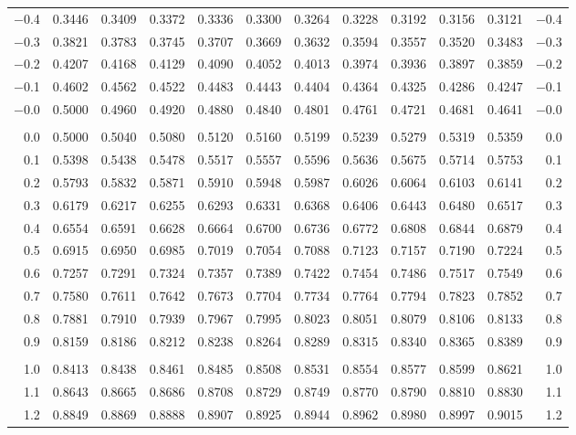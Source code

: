 \documentclass[12pt]{article}
\begin{document}
\begin{landscape}
\begin{adjustbox}{angle=270}
\begin{tabular}{r@{\hspace{4.5mm}}
	*5{c @{\hspace{2.5mm}}}@{\hspace{-0.5mm}}*5{@{\hspace{2.5mm}}c}@{\hspace{2mm}}r}
$-$0.4 & 0.3446 & 0.3409 & 0.3372 & 0.3336 & 0.3300 & 0.3264 & 0.3228 & 0.3192 & 0.3156 & 0.3121 & $-$0.4 \\
$-$0.3 & 0.3821 & 0.3783 & 0.3745 & 0.3707 & 0.3669 & 0.3632 & 0.3594 & 0.3557 & 0.3520 & 0.3483 & $-$0.3 \\
$-$0.2 & 0.4207 & 0.4168 & 0.4129 & 0.4090 & 0.4052 & 0.4013 & 0.3974 & 0.3936 & 0.3897 & 0.3859 & $-$0.2 \\
$-$0.1 & 0.4602 & 0.4562 & 0.4522 & 0.4483 & 0.4443 & 0.4404 & 0.4364 & 0.4325 & 0.4286 & 0.4247 & $-$0.1 \\
$-$0.0 & 0.5000 & 0.4960 & 0.4920 & 0.4880 & 0.4840 & 0.4801 & 0.4761 & 0.4721 & 0.4681 & 0.4641 & $-$0.0 \\
&&&&&&&&&&{} \\
0.0 & 0.5000 & 0.5040 & 0.5080 & 0.5120 & 0.5160 & 0.5199 & 0.5239 & 0.5279 & 0.5319 & 0.5359 & 0.0 \\
0.1 & 0.5398 & 0.5438 & 0.5478 & 0.5517 & 0.5557 & 0.5596 & 0.5636 & 0.5675 & 0.5714 & 0.5753 & 0.1 \\
0.2 & 0.5793 & 0.5832 & 0.5871 & 0.5910 & 0.5948 & 0.5987 & 0.6026 & 0.6064 & 0.6103 & 0.6141 & 0.2 \\
0.3 & 0.6179 & 0.6217 & 0.6255 & 0.6293 & 0.6331 & 0.6368 & 0.6406 & 0.6443 & 0.6480 & 0.6517 & 0.3 \\
0.4 & 0.6554 & 0.6591 & 0.6628 & 0.6664 & 0.6700 & 0.6736 & 0.6772 & 0.6808 & 0.6844 & 0.6879 & 0.4 \\
0.5 & 0.6915 & 0.6950 & 0.6985 & 0.7019 & 0.7054 & 0.7088 & 0.7123 & 0.7157 & 0.7190 & 0.7224 & 0.5 \\
0.6 & 0.7257 & 0.7291 & 0.7324 & 0.7357 & 0.7389 & 0.7422 & 0.7454 & 0.7486 & 0.7517 & 0.7549 & 0.6 \\
0.7 & 0.7580 & 0.7611 & 0.7642 & 0.7673 & 0.7704 & 0.7734 & 0.7764 & 0.7794 & 0.7823 & 0.7852 & 0.7 \\
0.8 & 0.7881 & 0.7910 & 0.7939 & 0.7967 & 0.7995 & 0.8023 & 0.8051 & 0.8079 & 0.8106 & 0.8133 & 0.8 \\
0.9 & 0.8159 & 0.8186 & 0.8212 & 0.8238 & 0.8264 & 0.8289 & 0.8315 & 0.8340 & 0.8365 & 0.8389 & 0.9 \\
&&&&&&&&&&{} \\
1.0 & 0.8413 & 0.8438 & 0.8461 & 0.8485 & 0.8508 & 0.8531 & 0.8554 & 0.8577 & 0.8599 & 0.8621 & 1.0 \\
1.1 & 0.8643 & 0.8665 & 0.8686 & 0.8708 & 0.8729 & 0.8749 & 0.8770 & 0.8790 & 0.8810 & 0.8830 & 1.1 \\
1.2 & 0.8849 & 0.8869 & 0.8888 & 0.8907 & 0.8925 & 0.8944 & 0.8962 & 0.8980 & 0.8997 & 0.9015 & 1.2 \\

\end{tabular}
\end{adjustbox}
\end{landscape}
\end{document}
